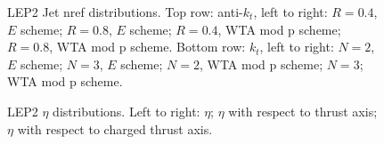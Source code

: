 \begin{figure}[H]
\hfill
{}\hfill
{}\hfill
\caption{LEP2 Jet nref distributions. Top row: anti-$k_t$, left to right: $R=0.4$, $E$ scheme; $R=0.8$, $E$ scheme; $R=0.4$, WTA mod p scheme; $R=0.8$, WTA mod p scheme. Bottom row: $k_t$, left to right: $N=2$, $E$ scheme; $N=3$, $E$ scheme; $N=2$, WTA mod p scheme; $N=3$; WTA mod p scheme.}  
\end{figure}

\begin{figure}[H]
\centering
{}\hfill
{}\hfill
{}\hfill
\caption{LEP2 $\eta$ distributions. Left to right: $\eta$; $\eta$ with respect to thrust axis; $\eta$ with respect to charged thrust axis.}
\end{figure}

